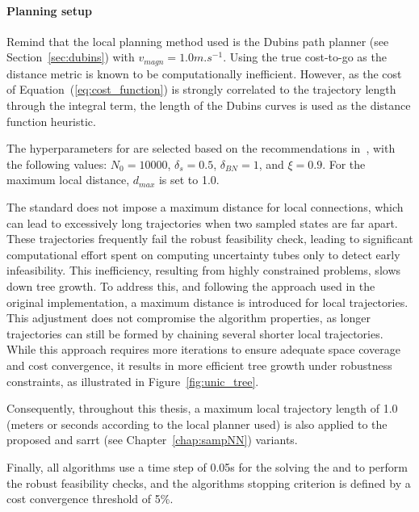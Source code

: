 \paragraph{Planning setup}

Remind that the local planning method used is the Dubins path planner (see Section~\ref{sec:dubins}) with $v_{magn} = 1.0 m.s^{-1}$. 
Using the true cost-to-go as the distance metric is known to be computationally inefficient. 
However, as the cost of Equation~(\ref{eq:cost_function}) is strongly correlated to the trajectory length through the integral term, the length of the Dubins curves is used as the distance function heuristic. 

The hyperparameters for  are selected based on the recommendations in~\cite{cSST}, with the following values: $N_0 = 10000$, $\delta_s = 0.5$, $\delta_{BN} = 1$, and $\xi = 0.9$.
For the maximum local distance, $d_{max}$ is set to 1.0.

The standard  does not impose a maximum distance for local connections, which can lead to excessively long trajectories when two sampled states are far apart.
These trajectories frequently fail the robust feasibility check, leading to significant computational effort spent on computing uncertainty tubes only to detect early infeasibility. 
This inefficiency, resulting from highly constrained problems, slows down tree growth.
To address this, and following the approach used in the original  implementation, a maximum distance is introduced for local trajectories. 
This adjustment does not compromise the algorithm properties, as longer trajectories can still be formed by chaining several shorter local trajectories. 
While this approach requires more iterations to ensure adequate space coverage and cost convergence, it results in more efficient tree growth under robustness constraints, as illustrated in Figure~\ref{fig:unic_tree}.

Consequently, throughout this thesis, a maximum local trajectory length of 1.0 (meters or seconds according to the local planner used) is also applied to the proposed  and \gls{sarrt} (see Chapter~\ref{chap:sampNN}) variants.

Finally, all algorithms use a time step of 0.05s for the solving the  and to perform the robust feasibility checks, and the algorithms stopping criterion is defined by a cost convergence threshold of 5\%.

